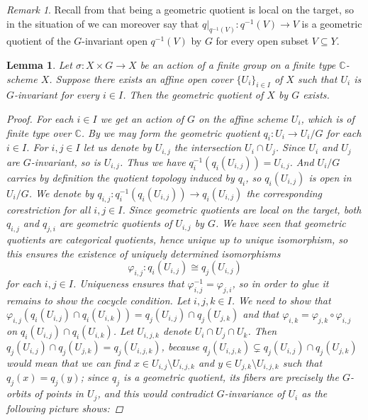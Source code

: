 \documentclass[12pt,a4paper]{amsart}
\theoremstyle{plain}
\newtheorem{lm}[thm]{Lemma}
\theoremstyle{definition}
\theoremstyle{remark}
\newtheorem{rem}[thm]{Remark}
\begin{document}
\begin{rem}\label{rem:loct2}
  Recall from  that being a geometric quotient is local on the target, so in the situation of  we can moreover say that $q|_{q^{-1}(V)} \colon q^{-1}(V) \to V$ is a geometric quotient of the $G$-invariant open $q^{-1}(V)$ by $G$ for every open subset $V \subseteq Y$.
\end{rem}

\begin{lm}\label{lm:affinecover}
  Let $\sigma \colon X \times G \to X$ be an action of a finite group on a finite type $\mathbb{C}$-scheme $X$.
  Suppose there exists an affine open cover $\{ U_{i} \}_{i \in I}$ of $X$ such that $U_{i}$ is $G$-invariant for every $i \in I$.
  Then the geometric quotient of $X$ by $G$ exists.

  \begin{proof}
    For each $i \in I$ we get an action of $G$ on the affine scheme $U_{i}$, which is of finite type over $\mathbb{C}$.
    By  we may form the geometric quotient $q_{i} \colon U_{i} \to U_{i}/G$ for each $i \in I$.
    For $i, j \in I$ let us denote by $U_{i,j}$ the intersection $U_{i} \cap U_{j}$.
    Since $U_{i}$ and $U_{j}$ are $G$-invariant, so is $U_{i,j}$.
    Thus we have $q_{i}^{-1}(q_{i}(U_{i,j})) = U_{i,j}$.
    And $U_{i}/G$ carries by definition the quotient topology induced by $q_{i}$, so $q_{i}(U_{i,j})$ is open in $U_{i}/G$.
    We denote by $q_{i,j} \colon q_{i}^{-1}(q_{i}(U_{i,j})) \to q_{i}(U_{i,j})$ the corresponding corestriction for all $i, j \in I$.
    Since geometric quotients are local on the target, both $q_{i,j}$ and $q_{j,i}$ are geometric quotients of $U_{i,j}$ by $G$.
    We have seen that geometric quotients are categorical quotients, hence unique up to unique isomorphism, so this ensures the existence of uniquely determined isomorphisms
    \[ \varphi_{i,j} \colon q_{i}(U_{i,j}) \cong q_{j}(U_{i,j}) \]
    for each $i, j \in I$.
    Uniqueness ensures that $\varphi_{i,j}^{-1} = \varphi_{j,i}$, so in order to glue it remains to show the cocycle condition.
    Let $i, j, k \in I$.
    We need to show that $\varphi_{i,j}(q_{i}(U_{i,j})\cap q_{i}(U_{i,k})) = q_{j}(U_{i,j}) \cap q_{j}(U_{j,k})$ and that $\varphi_{i,k} = \varphi_{j,k} \circ \varphi_{i,j}$ on $q_{i}(U_{i,j}) \cap q_{i}(U_{i,k})$.
    Let $U_{i,j,k}$ denote $U_{i} \cap U_{j} \cap U_{k}$.
    Then $q_{j}(U_{i,j}) \cap q_{j}(U_{j,k}) = q_{j}(U_{i,j,k})$, because $q_{j}(U_{i,j,k}) \subsetneq q_{j}(U_{i,j}) \cap q_{j}(U_{j,k})$ would mean that we can find $x \in U_{i,j} \setminus U_{i,j,k}$ and $y \in U_{j,k} \setminus U_{i,j,k}$ such that $q_{j}(x) = q_{j}(y)$; since $q_{j}$ is a geometric quotient, its fibers are precisely the $G$-orbits of points in $U_{j}$, and this would contradict $G$-invariance of $U_{i}$ as the following picture shows:


\end{proof}
\end{lm}
\end{document}
